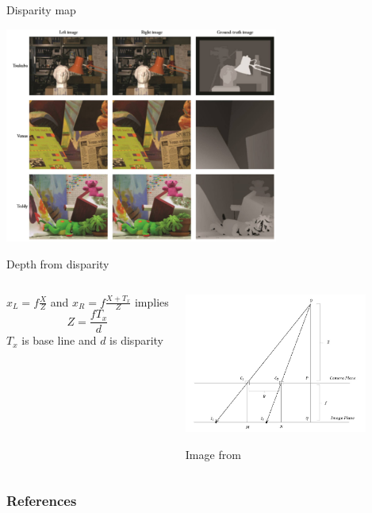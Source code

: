\documentclass{beamer}
\begin{document}
\begin{frame}{Disparity map}
    \begin{center}
        \includegraphics[width=9cm]{disparity_map.jpg}
    \end{center}
\end{frame}

\begin{frame}{Depth from disparity}
    \begin{columns}
        $x_L=f\frac{X}{Z}$ and $x_R=f\frac{X+T_x}{Z}$ implies
        $$Z=\frac{fT_x}{d}$$
        $T_x$ is base line and $d$ is disparity
        \begin{center}
            \includegraphics[width=6cm]{depth_from_disparity.JPG}
            \par Image from \cite{chaijirawiwat_monocular_2019}
        \end{center}
    \end{columns}
    
\end{frame}

\begin{frame}[allowframebreaks]
    \frametitle{References}
    \nocite{*}
    
    
\end{frame}
\end{document}
